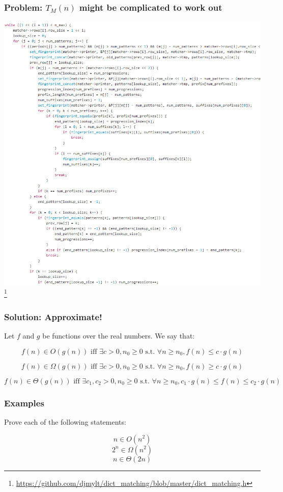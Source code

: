\documentclass[aspectratio=169]{beamer}
\begin{document}
\begin{frame}
\frametitle{Problem: $T_M(n)$ might be complicated to work out}
\includegraphics[scale=0.25]{complex_code}\footnote{\url{https://github.com/djmylt/dict_matching/blob/master/dict_matching.h}}
\end{frame}

\begin{frame}
\frametitle{Solution: Approximate!}
Let $f$ and $g$ be functions over the real numbers. We say that:

$$f(n) \in O(g(n)) \text{ iff } \exists c > 0, n_0 \geq 0 \text{ s.t. } \forall n \geq n_0, f(n) \leq c \cdot g(n)$$

$$f(n) \in \Omega(g(n)) \text{ iff } \exists c > 0, n_0 \geq 0 \text{ s.t. } \forall n \geq n_0, f(n) \geq c \cdot g(n)$$

$$f(n) \in \Theta(g(n)) \text{ iff } \exists c_1, c_2 > 0, n_0 \geq 0 \text{ s.t. } \forall n \geq n_0, c_1 \cdot g(n) \leq f(n) \leq c_2 \cdot g(n)$$
\end{frame}

\begin{frame}
\frametitle{Examples}
Prove each of the following statements:

$$n \in O(n^2)$$
$$2^n \in \Omega(n^2)$$
$$n \in \Theta(2n)$$
\end{frame}
\end{document}
